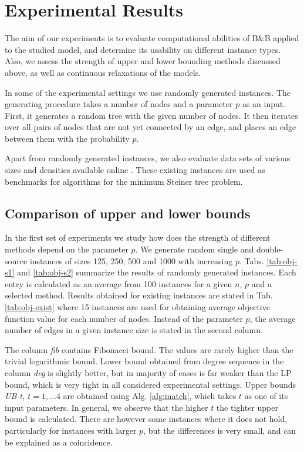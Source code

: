 \section{Experimental Results} \label{sec:exp}

The aim of our experiments is to evaluate computational abilities of B\&B applied to the studied model, and determine its usability on different instance types.
Also, we assess the strength of upper and lower bounding methods discussed above, as well as continuous relaxations of the models.

In some of the experimental settings we use randomly generated instances.
The generating procedure takes a number of nodes and a parameter $p$ as an input.
First, it generates a random tree with the given number of nodes.
It then iterates over all pairs of nodes that are not yet connected by an edge, and places an edge between them with the probability $p$.

Apart from randomly generated instances, we also evaluate data sets of various sizes and densities available online \cite{steinlib}.
These existing instances are used as benchmarks for algorithms for the minimum Steiner tree problem.

\subsection{Comparison of upper and lower bounds}

In the first set of experiments we study how does the strength of different methods depend on the parameter $p$.
We generate random single and double-source instances of sizes 125, 250, 500 and 1000 with increasing $p$.
Tabs. \ref{tab:obj-s1} and \ref{tab:obj-s2} summarize the results of randomly generated instances.
Each entry is calculated as an average from 100 instances for a given $n$, $p$ and a selected method.
Results obtained for existing instances are stated in Tab. \ref{tab:obj-exist} where 15 instances are used for obtaining average objective function value for each number of nodes.
Instead of the parameter $p$, the average number of edges in a given instance size is stated in the second column.

The column \emph{fib} contains Fibonacci bound.
The values are rarely higher than the trivial logarithmic bound.
Lower bound obtained from degree sequence in the column \emph{deg} is slightly better, 
but in majority of cases is far weaker than the LP bound, which is very tight in all considered experimental settings.
Upper bounds \emph{UB-t, $t=1,\dots 4$} are obtained using Alg. \ref{alg:match}, which takes $t$ as one of its input parameters.
In general, we observe that the higher $t$ the tighter upper bound is calculated.
There are however some instances where it does not hold, particularly for instances with larger $p$,  but the differences is very small, and can be explained as a coincidence.

